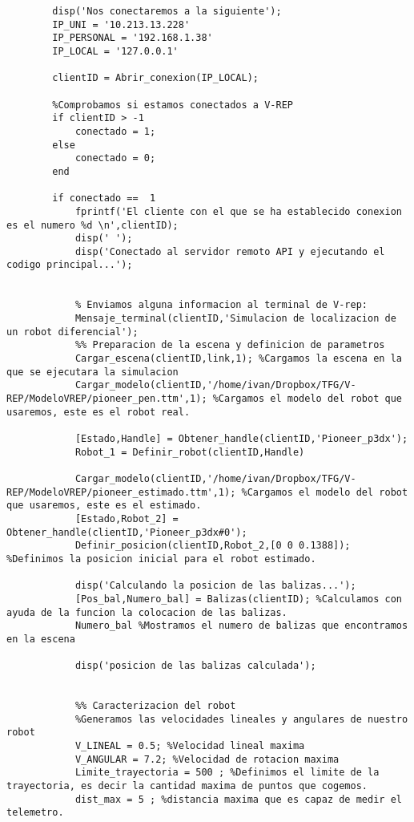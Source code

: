 \begin{lstlisting}[frame=single]
        %Aqui es donde empieza el codigo principal
        disp('Nos conectaremos a la siguiente');
        IP_UNI = '10.213.13.228'
        IP_PERSONAL = '192.168.1.38'
        IP_LOCAL = '127.0.0.1'

        clientID = Abrir_conexion(IP_LOCAL);

        %Comprobamos si estamos conectados a V-REP
        if clientID > -1 
            conectado = 1;
        else 
            conectado = 0;
        end

        if conectado ==  1
            fprintf('El cliente con el que se ha establecido conexion es el numero %d \n',clientID);
            disp(' ');
            disp('Conectado al servidor remoto API y ejecutando el codigo principal...');
            	

            % Enviamos alguna informacion al terminal de V-rep:
            Mensaje_terminal(clientID,'Simulacion de localizacion de un robot diferencial');
            %% Preparacion de la escena y definicion de parametros
            Cargar_escena(clientID,link,1); %Cargamos la escena en la que se ejecutara la simulacion
            Cargar_modelo(clientID,'/home/ivan/Dropbox/TFG/V-REP/ModeloVREP/pioneer_pen.ttm',1); %Cargamos el modelo del robot que usaremos, este es el robot real.
            
            [Estado,Handle] = Obtener_handle(clientID,'Pioneer_p3dx');
            Robot_1 = Definir_robot(clientID,Handle)
            
            Cargar_modelo(clientID,'/home/ivan/Dropbox/TFG/V-REP/ModeloVREP/pioneer_estimado.ttm',1); %Cargamos el modelo del robot que usaremos, este es el estimado.
            [Estado,Robot_2] = Obtener_handle(clientID,'Pioneer_p3dx#0');
            Definir_posicion(clientID,Robot_2,[0 0 0.1388]); %Definimos la posicion inicial para el robot estimado.
            
            disp('Calculando la posicion de las balizas...');
            [Pos_bal,Numero_bal] = Balizas(clientID); %Calculamos con ayuda de la funcion la colocacion de las balizas.
            Numero_bal %Mostramos el numero de balizas que encontramos en la escena 
            
            disp('posicion de las balizas calculada');
            

            %% Caracterizacion del robot
            %Generamos las velocidades lineales y angulares de nuestro robot
            V_LINEAL = 0.5; %Velocidad lineal maxima
            V_ANGULAR = 7.2; %Velocidad de rotacion maxima
            Limite_trayectoria = 500 ; %Definimos el limite de la trayectoria, es decir la cantidad maxima de puntos que cogemos.
            dist_max = 5 ; %distancia maxima que es capaz de medir el telemetro.


\end{lstlisting}
